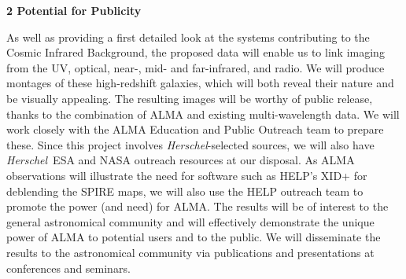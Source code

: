 \documentclass[12pt,a4paper]{article}
\newcommand{\herschel}{{\it Herschel}}
\newcommand{\micron}{$\mu$m}
\begin{document}




\vspace{0.2cm}
{\large{\bf 2 Potential for Publicity}}



As well as providing a first detailed look at the
systems contributing to the Cosmic Infrared Background, the proposed
data will enable us to link imaging from the UV, optical, near-, mid-
and far-infrared, and radio. We will produce montages of these
high-redshift galaxies, which will both reveal their nature and be
visually appealing. The resulting images will be worthy of public release,
thanks to the combination of ALMA and existing
multi-wavelength data.  We
will work closely with the ALMA Education and Public Outreach team to
prepare these. Since this project involves \herschel-selected sources,
we will also have \herschel\ ESA and NASA outreach resources at our
disposal. As ALMA observations will illustrate the need for software such as HELP's XID+ for deblending the SPIRE maps, we will also use the HELP outreach team to promote the power (and need) for ALMA. The results will be of interest to the general astronomical
community and will effectively demonstrate the unique power of ALMA to
potential users and to the public.  We will disseminate the results to
the astronomical community via publications and presentations at
conferences and seminars.
\end{document}
